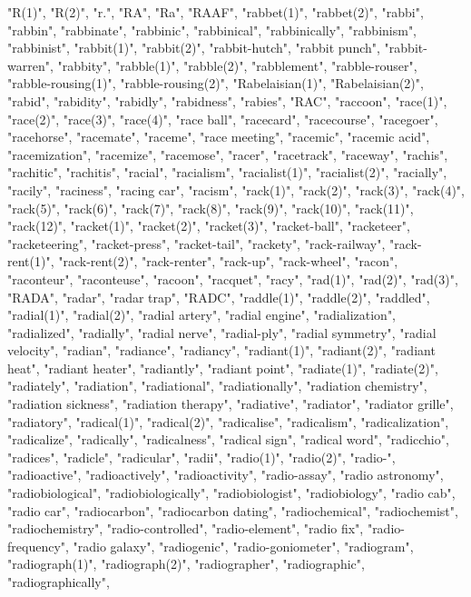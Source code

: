 "R(1)",
"R(2)",
"r.",
"RA",
"Ra",
"RAAF",
"rabbet(1)",
"rabbet(2)",
"rabbi",
"rabbin",
"rabbinate",
"rabbinic",
"rabbinical",
"rabbinically",
"rabbinism",
"rabbinist",
"rabbit(1)",
"rabbit(2)",
"rabbit-hutch",
"rabbit punch",
"rabbit-warren",
"rabbity",
"rabble(1)",
"rabble(2)",
"rabblement",
"rabble-rouser",
"rabble-rousing(1)",
"rabble-rousing(2)",
"Rabelaisian(1)",
"Rabelaisian(2)",
"rabid",
"rabidity",
"rabidly",
"rabidness",
"rabies",
"RAC",
"raccoon",
"race(1)",
"race(2)",
"race(3)",
"race(4)",
"race ball",
"racecard",
"racecourse",
"racegoer",
"racehorse",
"racemate",
"raceme",
"race meeting",
"racemic",
"racemic acid",
"racemization",
"racemize",
"racemose",
"racer",
"racetrack",
"raceway",
"rachis",
"rachitic",
"rachitis",
"racial",
"racialism",
"racialist(1)",
"racialist(2)",
"racially",
"racily",
"raciness",
"racing car",
"racism",
"rack(1)",
"rack(2)",
"rack(3)",
"rack(4)",
"rack(5)",
"rack(6)",
"rack(7)",
"rack(8)",
"rack(9)",
"rack(10)",
"rack(11)",
"rack(12)",
"racket(1)",
"racket(2)",
"racket(3)",
"racket-ball",
"racketeer",
"racketeering",
"racket-press",
"racket-tail",
"rackety",
"rack-railway",
"rack-rent(1)",
"rack-rent(2)",
"rack-renter",
"rack-up",
"rack-wheel",
"racon",
"raconteur",
"raconteuse",
"racoon",
"racquet",
"racy",
"rad(1)",
"rad(2)",
"rad(3)",
"RADA",
"radar",
"radar trap",
"RADC",
"raddle(1)",
"raddle(2)",
"raddled",
"radial(1)",
"radial(2)",
"radial artery",
"radial engine",
"radialization",
"radialized",
"radially",
"radial nerve",
"radial-ply",
"radial symmetry",
"radial velocity",
"radian",
"radiance",
"radiancy",
"radiant(1)",
"radiant(2)",
"radiant heat",
"radiant heater",
"radiantly",
"radiant point",
"radiate(1)",
"radiate(2)",
"radiately",
"radiation",
"radiational",
"radiationally",
"radiation chemistry",
"radiation sickness",
"radiation therapy",
"radiative",
"radiator",
"radiator grille",
"radiatory",
"radical(1)",
"radical(2)",
"radicalise",
"radicalism",
"radicalization",
"radicalize",
"radically",
"radicalness",
"radical sign",
"radical word",
"radicchio",
"radices",
"radicle",
"radicular",
"radii",
"radio(1)",
"radio(2)",
"radio-",
"radioactive",
"radioactively",
"radioactivity",
"radio-assay",
"radio astronomy",
"radiobiological",
"radiobiologically",
"radiobiologist",
"radiobiology",
"radio cab",
"radio car",
"radiocarbon",
"radiocarbon dating",
"radiochemical",
"radiochemist",
"radiochemistry",
"radio-controlled",
"radio-element",
"radio fix",
"radio-frequency",
"radio galaxy",
"radiogenic",
"radio-goniometer",
"radiogram",
"radiograph(1)",
"radiograph(2)",
"radiographer",
"radiographic",
"radiographically",
